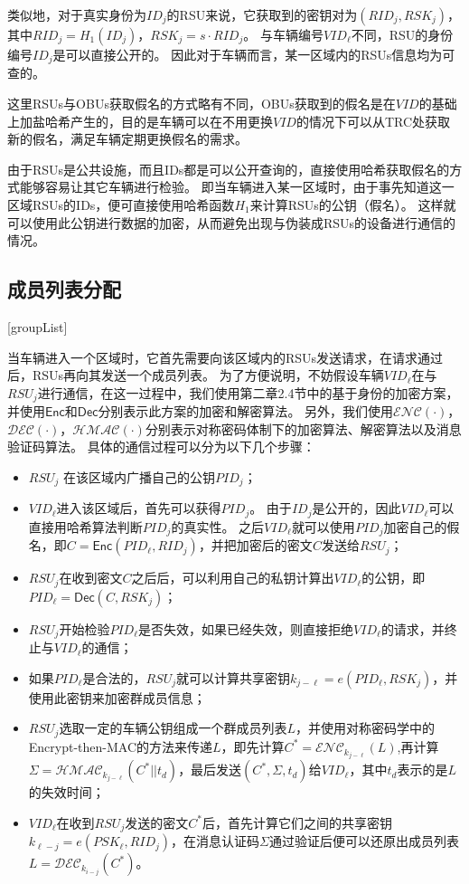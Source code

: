 类似地，对于真实身份为$ID_j$的RSU来说，它获取到的密钥对为$(RID_j,RSK_j)$，其中$RID_j=H_1(ID_j)$，$RSK_j=s\cdot RID_j$。
与车辆编号$VID_\ell$不同，RSU的身份编号$ID_j$是可以直接公开的。
因此对于车辆而言，某一区域内的RSUs信息均为可查的。

这里RSUs与OBUs获取假名的方式略有不同，OBUs获取到的假名是在$VID$的基础上加盐哈希产生的，目的是车辆可以在不用更换$VID$的情况下可以从TRC处获取新的假名，满足车辆定期更换假名的需求。

由于RSUs是公共设施，而且IDs都是可以公开查询的，直接使用哈希获取假名的方式能够容易让其它车辆进行检验。
即当车辆进入某一区域时，由于事先知道这一区域RSUs的IDs，便可直接使用哈希函数$H_1$来计算RSUs的公钥（假名）。
这样就可以使用此公钥进行数据的加密，从而避免出现与伪装成RSUs的设备进行通信的情况。

\subsection{成员列表分配}[groupList]

当车辆进入一个区域时，它首先需要向该区域内的RSUs发送请求，在请求通过后，RSUs再向其发送一个成员列表。
为了方便说明，不妨假设车辆$VID_\ell$在与$RSU_j$进行通信，在这一过程中，我们使用第二章2.4节中的基于身份的加密方案，并使用$\mathsf{Enc}$和$\mathsf{Dec}$分别表示此方案的加密和解密算法\cite{boneh2001identity}。
另外，我们使用$\mathcal{ENC}(\cdot)$，$\mathcal{DEC}(\cdot)$，$\mathcal{HMAC}(\cdot)$分别表示对称密码体制下的加密算法、解密算法以及消息验证码算法。
具体的通信过程可以分为以下几个步骤：

\begin{itemize}
  \item $RSU_j$ 在该区域内广播自己的公钥$PID_j$；
  \item $VID_\ell$进入该区域后，首先可以获得$PID_j$。
  由于$ID_j$是公开的，因此$VID_\ell$可以直接用哈希算法判断$PID_j$的真实性。
  之后$VID_\ell$就可以使用$PID_j$加密自己的假名，即$C=\mathsf{Enc}(PID_\ell,RID_j)$，并把加密后的密文$C$发送给$RSU_j$；
  \item $RSU_j$在收到密文$C$之后后，可以利用自己的私钥计算出$VID_\ell$的公钥，即$PID_\ell=\mathsf{Dec}(C,RSK_j)$；
  \item $RSU_j$开始检验$PID_\ell$是否失效，如果已经失效，则直接拒绝$VID_\ell$的请求，并终止与$VID_\ell$的通信；
  \item 如果$PID_\ell$是合法的，$RSU_j$就可以计算共享密钥$k_{j-\ell}=e(PID_\ell,RSK_j)$，并使用此密钥来加密群成员信息；
  \item $RSU_j$选取一定的车辆公钥组成一个群成员列表$L$，并使用对称密码学中的Encrypt-then-MAC的方法来传递$L$，即先计算$C^*=\mathcal{ENC}_{k_{j-\ell}}(L)$,再计算$\Sigma=\mathcal{HMAC}_{k_{j-\ell}}(C^*||t_d)$，最后发送$(C^*,\Sigma,t_d)$给$VID_\ell$，其中$t_d$表示的是$L$的失效时间；
  \item $VID_\ell$在收到$RSU_j$发送的密文$C^*$后，首先计算它们之间的共享密钥$k_{\ell-j}=e(PSK_\ell,RID_j)$，在消息认证码$\Sigma$通过验证后便可以还原出成员列表$L=\mathcal{DEC}_{k_{i-j}}(C^*)$。
\end{itemize}

